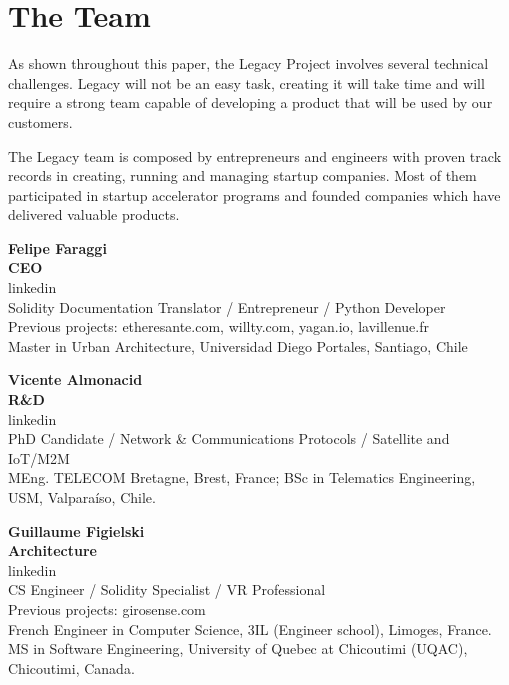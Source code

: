 \chapter{The Team} %
\label{cha:the_team}

As shown throughout this paper, the Legacy Project involves several technical challenges. 
Legacy will not be an easy task, creating it will take time and will require a strong team capable of developing a product that will be used by our customers.

The Legacy team is composed by entrepreneurs and engineers with proven track records in creating, running and managing startup companies. Most of them participated in startup accelerator programs and founded companies which have delivered valuable products.

\vspace{5mm} 
 
\noindent
\textbf{Felipe Faraggi} \\
\textbf{CEO} \\
linkedin \\
Solidity Documentation Translator / Entrepreneur / Python Developer \\
Previous projects: etheresante.com, willty.com, yagan.io, lavillenue.fr \\
Master in Urban Architecture, Universidad Diego Portales, Santiago, Chile

\vspace{5mm} %
 
\noindent
\textbf{Vicente Almonacid} \\
\textbf{R\&D} \\
linkedin \\
PhD Candidate / Network \& Communications Protocols / Satellite and IoT/M2M \\
MEng. TELECOM Bretagne, Brest, France; BSc in Telematics Engineering, USM, Valparaíso, Chile.

\vspace{5mm} %
 
\noindent
\textbf{Guillaume Figielski} \\
\textbf{Architecture} \\
linkedin \\
CS Engineer / Solidity Specialist / VR Professional \\
Previous projects: girosense.com \\
French Engineer in Computer Science, 3IL (Engineer school), Limoges, France. \\
MS in Software Engineering, University of Quebec at Chicoutimi (UQAC), Chicoutimi, Canada. \\

